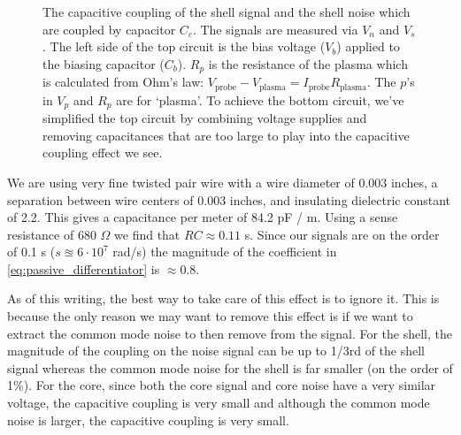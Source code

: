 \begin{figure}
    \caption{The capacitive coupling of the shell signal and the shell noise which are coupled by capacitor $C_c$. The signals are measured via $V_n$ and $V_s$. The left side of the top circuit is the bias voltage ($V_b$) applied to the biasing capacitor ($C_b$). $R_p$ is the resistance of the plasma which is calculated from Ohm's law: $V_\text{probe} - V_\text{plasma} = I_\text{probe} R_\text{plasma}$. The $p$'s in $V_p$ and $R_p$ are for `plasma'. To achieve the bottom circuit, we've simplified the top circuit by combining voltage supplies and removing capacitances that are too large to play into the capacitive coupling effect we see.}
    \label{fig:pa_tip_circuit_diagram_w_coupling}
\end{figure}


We are using very fine twisted pair wire with a wire diameter of 0.003 inches, a separation between wire centers of 0.003 inches, and insulating dielectric constant of 2.2. This gives a capacitance per meter of 84.2 pF / m. Using a sense resistance of 680 $\Omega$ we find that $RC \approx 0.11$ \textmu s. Since our signals are on the order of 0.1 \textmu s ($s \approxeq 6 \cdot 10^7$ rad/s) the magnitude of the coefficient in \ref{eq:passive_differentiator} is $\approx 0.8$.


As of this writing, the best way to take care of this effect is to ignore it. This is because the only reason we may want to remove this effect is if we want to extract the common mode noise to then remove from the signal. For the shell, the magnitude of the coupling on the noise signal can be up to 1/3rd of the shell signal whereas the common mode noise for the shell is far smaller (on the order of 1\%). For the core, since both the core signal and core noise have a very similar voltage, the capacitive coupling is very small and although the common mode noise is larger, the capacitive coupling is very small.

